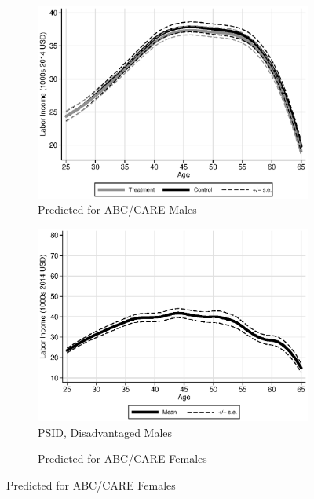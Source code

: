 \begin{figure}
\centering
\caption{Labor Income Profiles, Prediction Based on $\bm{B}$}\label{fig:labor-income-profiles}
\begin{subfigure}[h]{0.4\textwidth}
		\centering
		\caption{Predicted for ABC/CARE Males} \label{fig:abcare1}
		\includegraphics[width=\textwidth]{output/labor_25-60_male_4.eps}
\end{subfigure}%
\begin{subfigure}[h]{0.4\textwidth}
	\centering
	\caption{PSID, Disadvantaged Males} \label{fig:psid1}
		\includegraphics[width=\textwidth]{output/psid_incomeprofiles_s1.eps}
\end{subfigure}
\begin{subfigure}[h]{0.4\textwidth}
		\centering
		\caption{Predicted for ABC/CARE Females} \label{fig:abcare0}

\end{subfigure}
\end{figure}
